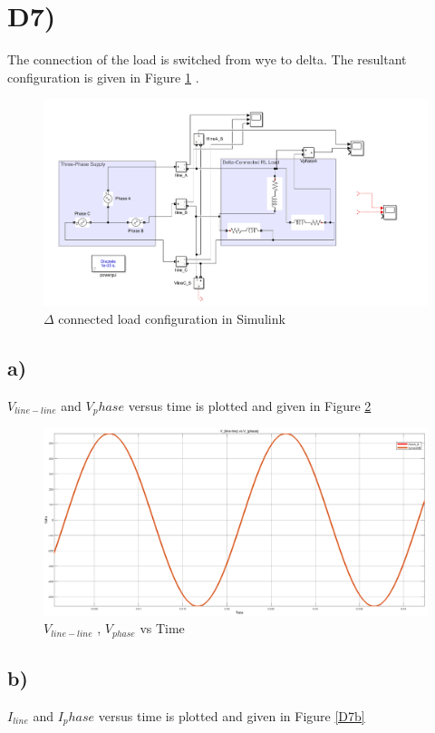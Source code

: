 \documentclass[letterpaper,12pt]{article}
\begin{document}
\section{D7)}
The connection of the load is switched from wye to delta. The resultant configuration is given in Figure \ref*{D7_ss} .
\begin{figure}[H]
    \centering
    \includegraphics[width = 1\textwidth]{7_ss.png}
    \caption{\(\Delta\) connected load configuration in Simulink}
    \label{D7_ss}
\end{figure}

\subsection{a)}
\(V_{line-line}\) and \(V_phase\) versus time is plotted and given in Figure \ref*{D7a}

\begin{figure}[H]
    \centering
    \includegraphics[width = 1\textwidth]{7_1.png}
    \caption{\(V_{line-line}\) , \(V_{phase}\) vs Time }
    \label{D7a}
\end{figure}

\subsection{b)}
\(I_{line}\) and \(I_phase\) versus time is plotted and given in Figure \ref*{D7b}
\end{document}
